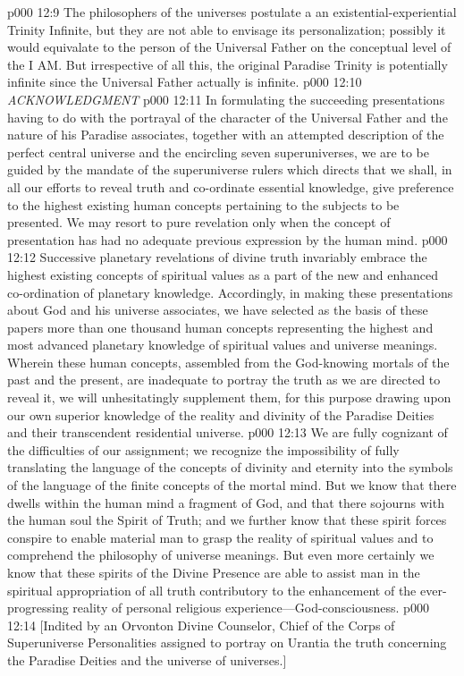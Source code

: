 \pc \vs p000 12:9 The philosophers of the universes postulate a  an existential\hyp{}experiential Trinity Infinite, but they are not able to envisage its personalization; possibly it would equivalate to the person of the Universal Father on the conceptual level of the I AM. But irrespective of all this, the original Paradise Trinity is potentially infinite since the Universal Father actually is infinite.
\vspace*{2\baselineskip}
\vs p000 12:10 {\hspace*{0.15\columnwidth}\itshape ACKNOWLEDGMENT}
\vspace*{\baselineskip}
\vs p000 12:11 In formulating the succeeding presentations having to do with the portrayal of the character of the Universal Father and the nature of his Paradise associates, together with an attempted description of the perfect central universe and the encircling seven superuniverses, we are to be guided by the mandate of the superuniverse rulers which directs that we shall, in all our efforts to reveal truth and co\hyp{}ordinate essential knowledge, give preference to the highest existing human concepts pertaining to the subjects to be presented. We may resort to pure revelation only when the concept of presentation has had no adequate previous expression by the human mind.
\vs p000 12:12 Successive planetary revelations of divine truth invariably embrace the highest existing concepts of spiritual values as a part of the new and enhanced co\hyp{}ordination of planetary knowledge. Accordingly, in making these presentations about God and his universe associates, we have selected as the basis of these papers more than one thousand human concepts representing the highest and most advanced planetary knowledge of spiritual values and universe meanings. Wherein these human concepts, assembled from the God\hyp{}knowing mortals of the past and the present, are inadequate to portray the truth as we are directed to reveal it, we will unhesitatingly supplement them, for this purpose drawing upon our own superior knowledge of the reality and divinity of the Paradise Deities and their transcendent residential universe.
\vs p000 12:13 We are fully cognizant of the difficulties of our assignment; we recognize the impossibility of fully translating the language of the concepts of divinity and eternity into the symbols of the language of the finite concepts of the mortal mind. But we know that there dwells within the human mind a fragment of God, and that there sojourns with the human soul the Spirit of Truth; and we further know that these spirit forces conspire to enable material man to grasp the reality of spiritual values and to comprehend the philosophy of universe meanings. But even more certainly we know that these spirits of the Divine Presence are able to assist man in the spiritual appropriation of all truth contributory to the enhancement of the ever\hyp{}progressing reality of personal religious experience---God\hyp{}consciousness.
\vsetoff
\vs p000 12:14 [Indited by an Orvonton Divine Counselor, Chief of the Corps of Superuniverse Personalities assigned to portray on Urantia the truth concerning the Paradise Deities and the universe of universes.]
